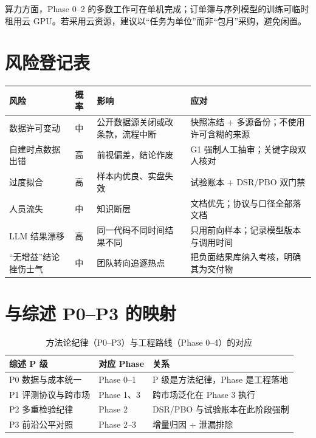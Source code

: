 \documentclass[11pt,a4paper]{ctexart}
\begin{document}
\noindent 算力方面，Phase 0--2 的多数工作可在单机完成；订单簿与序列模型的训练可临时租用云 GPU。若采用云资源，建议以“任务为单位”而非“包月”采购，避免闲置。

\section{风险登记表}

\begin{longtable}{@{}>{\raggedright\arraybackslash}p{3.2cm}>{\raggedright\arraybackslash}p{2.0cm}>{\raggedright\arraybackslash}p{4.4cm}>{\raggedright\arraybackslash}p{3.0cm}@{}}
\toprule
风险 & 概率 & 影响 & 应对 \\
\midrule
\endhead
数据许可变动 & 中 & 公开数据源关闭或改条款，流程中断 & 快照冻结 + 多源备份；不使用许可含糊的来源 \\
自建时点数据出错 & 高 & 前视偏差，结论作废 & G1 强制人工抽审；关键字段双人核对 \\
过度拟合 & 高 & 样本内优良、实盘失效 & 试验账本 + DSR/PBO 双门禁 \\
人员流失 & 中 & 知识断层 & 文档优先；协议与口径全部落文档 \\
LLM 结果漂移 & 高 & 同一代码不同时间结果不同 & 只用前向样本；记录模型版本与调用时间 \\
“无增益”结论挫伤士气 & 中 & 团队转向追逐热点 & 把负面结果库纳入考核，明确其为交付物 \\
\bottomrule
\end{longtable}

\section{与综述 P0--P3 的映射}

\begin{table}[htbp]
\centering
\caption{方法论纪律（P0--P3）与工程路线（Phase 0--4）的对应}
\label{tab:mapping}
\begin{tabular}{@{}>{\raggedright\arraybackslash}p{2.6cm}>{\raggedright\arraybackslash}p{2.6cm}>{\raggedright\arraybackslash}p{9.0cm}@{}}
\toprule
综述 P 级 & 对应 Phase & 关系 \\
\midrule
P0 数据与成本统一 & Phase 0--1 & P 级是方法纪律，Phase 是工程落地 \\
P1 评测协议与跨市场 & Phase 1、3 & 跨市场泛化在 Phase 3 执行 \\
P2 多重检验纪律 & Phase 2 & DSR/PBO 与试验账本在此阶段强制 \\
P3 前沿公平对照 & Phase 2--3 & 增量归因 + 泄漏排除 \\
\bottomrule
\end{tabular}
\end{table}
\end{document}
